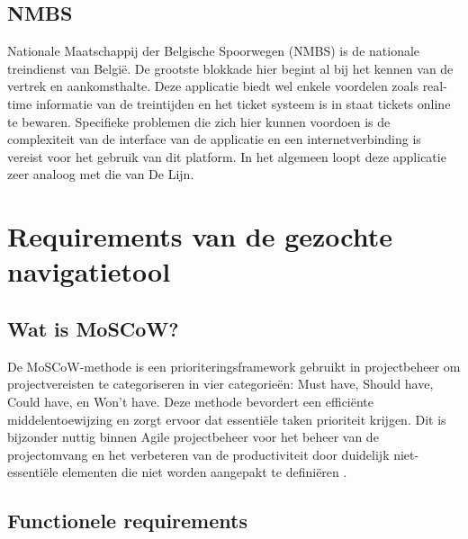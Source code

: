 \subsection{NMBS}
\label{sec:nmbs}

Nationale Maatschappij der Belgische Spoorwegen (NMBS) is de nationale treindienst van België. De grootste blokkade hier begint al bij het kennen van de vertrek en aankomsthalte. Deze applicatie biedt wel enkele voordelen zoals real-time informatie van de treintijden en het ticket systeem is in staat tickets online te bewaren. Specifieke problemen die zich hier kunnen voordoen is de complexiteit van de interface van de applicatie en een internetverbinding is vereist voor het gebruik van dit platform. In het algemeen loopt deze applicatie zeer analoog met die van De Lijn.

\section{Requirements van de gezochte navigatietool}
\label{sec:requirements van de gezochte navigatietool}

\subsection{Wat is MoSCoW?}
De MoSCoW-methode is een prioriteringsframework gebruikt in projectbeheer om projectvereisten te categoriseren in vier categorieën: Must have, Should have, Could have, en Won't have. Deze methode bevordert een efficiënte middelentoewijzing en zorgt ervoor dat essentiële taken prioriteit krijgen. Dit is bijzonder nuttig binnen Agile projectbeheer voor het beheer van de projectomvang en het verbeteren van de productiviteit door duidelijk niet-essentiële elementen die niet worden aangepakt te definiëren \autocite{Brush2023}.

\subsection{Functionele requirements}
\label{sec:functionele requirements}

